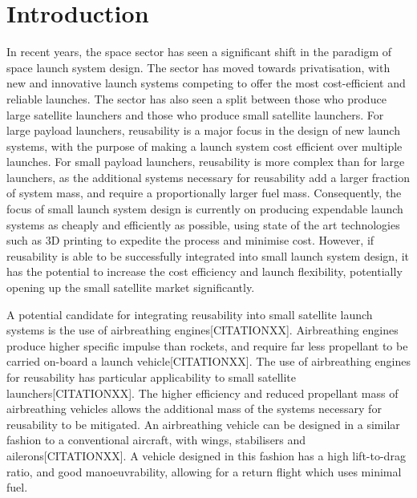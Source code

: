 
\cleardoublepage
\chapter{Introduction}

  	
  	
  	In recent years, the space sector has seen a significant shift in the paradigm of space launch system design. 
  	The sector has moved towards privatisation, with new and innovative launch systems competing to offer the most cost-efficient and reliable launches. 
  	The sector has also seen a split between those who produce large satellite launchers and those who produce small satellite launchers.
  	For large payload launchers, reusability is a major focus in the design of new launch systems, with the purpose of making a launch system cost efficient over multiple launches. 
  	For small payload launchers, reusability is more complex than for large launchers, as the additional systems necessary for reusability add a larger fraction of system mass, and require a proportionally larger fuel mass. 
  	Consequently, the focus of small launch system design is currently on producing expendable launch systems as cheaply and efficiently as possible, using state of the art technologies such as 3D printing to expedite the process and minimise cost.
  	However, if reusability is able to be successfully integrated into small launch system design, it has the potential to increase the cost efficiency and launch flexibility, potentially opening up the small satellite market significantly. 
  	
  	
  	
  	A potential candidate for integrating reusability into small satellite launch systems is the use of airbreathing engines[CITATIONXX].
Airbreathing engines produce higher specific impulse than rockets, and require far less propellant to be carried on-board a launch vehicle[CITATIONXX].  
 	The use of airbreathing engines for reusability has particular applicability to small satellite launchers[CITATIONXX]. 	 
  	The higher efficiency and reduced propellant mass of airbreathing vehicles allows the additional mass of the systems necessary for reusability to be mitigated. An airbreathing vehicle can be designed in a similar fashion to a conventional aircraft, with wings, stabilisers and ailerons[CITATIONXX]. A vehicle designed in this fashion has a high lift-to-drag ratio, and good manoeuvrability, allowing for a return flight which uses minimal fuel.
  	
